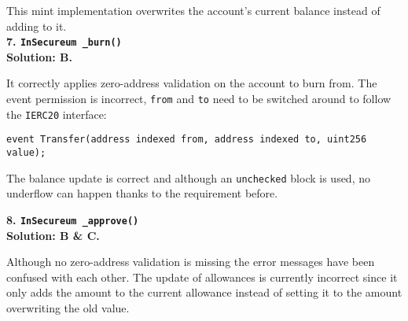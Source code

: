 This mint implementation overwrites the account's current balance instead of adding to it.\\

\textbf{7. \texttt{InSecureum \_burn()}}\label{sec:race4_q7}\\

\textbf{Solution: B.}

It correctly applies zero-address validation on the account to burn from.
The event permission is incorrect, \verb|from| and \verb|to| need to be switched around to follow the \verb|IERC20| interface:

\begin{lstlisting}[language=Solidity, style=solStyle]
event Transfer(address indexed from, address indexed to, uint256 value);
\end{lstlisting}

The balance update is correct and although an \verb|unchecked| block is used, no underflow can happen thanks to the requirement before.\\

\pagebreak

\textbf{8. \texttt{InSecureum \_approve()}}\label{sec:race4_q8}\\

\textbf{Solution: B \& C.}

Although no zero-address validation is missing the error messages have been confused with each other.
The update of allowances is currently incorrect since it only adds the amount to the current allowance instead of setting it to the amount overwriting the old value.\\
